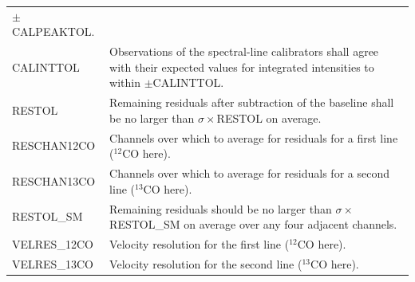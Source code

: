 \documentclass[11pt,oneside,chapters]{starlink}
\begin{document}
\begin{table}[h!]
\begin{tabular}{|p{4.0cm}|p{11.0cm}|}
                 $\pm$CALPEAKTOL.\\
CALINTTOL      & Observations of the spectral-line calibrators shall agree with
                 their expected values for integrated intensities to within
                 $\pm$CALINTTOL. \\
RESTOL         & Remaining residuals after subtraction of the baseline shall be
                 no larger than $\sigma\times$RESTOL on average. \\
RESCHAN12CO    & Channels over which to average for residuals for a first line
                 ($^{12}$CO here).\\
RESCHAN13CO    & Channels over which to average for residuals for a second line
                 ($^{13}$CO here).\\
RESTOL\_SM     & Remaining residuals should be no larger than
                 $\sigma\times$RESTOL\_SM on average over any four adjacent
                 channels. \\
VELRES\_12CO   & Velocity resolution for the first line ($^{12}$CO here). \\
VELRES\_13CO   & Velocity resolution for the second line ($^{13}$CO here). \\
\hline
\end{tabular}
\end{table}
\end{document}

